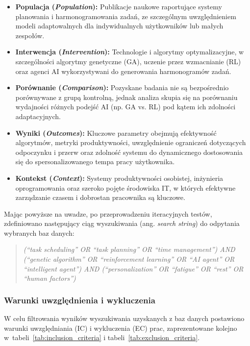 \begin{itemize}
    \item \textbf{Populacja (\textit{Population}):} Publikacje naukowe raportujące systemy planowania i harmonogramowania zadań, ze szczególnym uwzględnieniem modeli adaptowalnych dla indywidualnych użytkowników lub małych zespołów.
    \item \textbf{Interwencja (\textit{Intervention}):} Technologie i algorytmy optymalizacyjne, w szczególności algorytmy genetyczne (GA), uczenie przez wzmacnianie (RL) oraz agenci AI wykorzystywani do generowania harmonogramów zadań.
    \item \textbf{Porównanie (\textit{Comparison}):} Pozyskane badania nie są bezpośrednio porównywane z grupą kontrolną, jednak analiza skupia się na porównaniu wydajności różnych podejść AI (np. GA vs. RL) pod kątem ich zdolności adaptacyjnych.
    \item \textbf{Wyniki (\textit{Outcomes}):} Kluczowe parametry obejmują efektywność algorytmów, metryki produktywności, uwzględnienie ograniczeń dotyczących odpoczynku i przerw oraz zdolność systemu do dynamicznego dostosowania się do spersonalizowanego tempa pracy użytkownika.
    \item \textbf{Kontekst (\textit{Context}):} Systemy produktywności osobistej, inżynieria oprogramowania oraz szeroko pojęte środowiska IT, w których efektywne zarządzanie czasem i dobrostan pracownika są kluczowe.
\end{itemize}

\quad Mając powyższe na uwadze, po przeprowadzeniu iteracyjnych testów, zdefiniowano następujący ciąg wyszukiwania (ang. \textit{search string}) do odpytania wybranych baz danych:

\begin{quote}
\textit{(``task scheduling'' OR ``task planning'' OR ``time management'') AND (``genetic algorithm'' OR ``reinforcement learning'' OR ``AI agent'' OR ``intelligent agent'') AND (``personalization'' OR ``fatigue'' OR ``rest'' OR ``human factors'')}
\end{quote}

    
\subsubsection{Warunki uwzględnienia i wykluczenia}
\quad W celu filtrowania wyników wyszukiwania uzyskanych z baz danych postawiono warunki uwzględniania (IC) i wykluczenia (EC) prac, zaprezentowane kolejno w~tabeli~\ref{tab:inclusion_criteria} i tabeli~\ref{tab:exclusion_criteria}.


